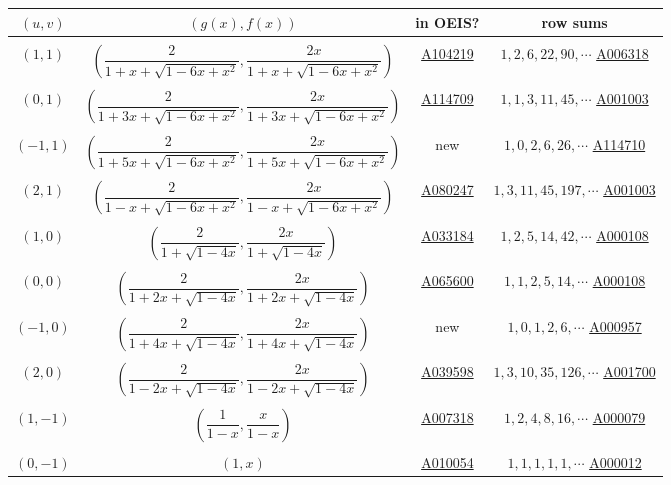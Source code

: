 \documentclass[11pt,reqno]{amsart}
\numberwithin{equation}{section}
\theoremstyle{plain}
\theoremstyle{definition}
\begin{document}
\begin{table}
{\small
\begin{tabular}{cccc}
\toprule
$(u,v)$ & $(g(x),f(x))$ & in OEIS? & row sums\\
\midrule
&&&\\
$(1,1)$ & $(\dfrac{2}{1+x+\sqrt{1-6x+x^2}},\dfrac{2x}{1+x+\sqrt{1-6x+x^2}})$ & \href{http://oeis.org/A104219}{A104219} & $1,2,6,22,90,\cdots$ \href{http://oeis.org/A006318}{A006318}\\
&&&\\
$(0,1)$ & $(\dfrac{2}{1+3x+\sqrt{1-6x+x^2}},\dfrac{2x}{1+3x+\sqrt{1-6x+x^2}})$ & \href{http://oeis.org/A114709}{A114709} & $1,1,3,11,45,\cdots$ \href{http://oeis.org/A001003}{A001003}\\
&&&\\
$(-1,1)$ & $(\dfrac{2}{1+5x+\sqrt{1-6x+x^2}},\dfrac{2x}{1+5x+\sqrt{1-6x+x^2}})$ & new & $1,0,2,6,26,\cdots$ \href{http://oeis.org/A114710}{A114710}\\
&&&\\
$(2,1)$ & $(\dfrac{2}{1-x+\sqrt{1-6x+x^2}},\dfrac{2x}{1-x+\sqrt{1-6x+x^2}})$ & \href{http://oeis.org/A080247}{A080247} & $1,3,11,45,197,\cdots$ \href{http://oeis.org/A001003}{A001003}\\
&&&\\
$(1,0)$ & $(\dfrac{2}{1+\sqrt{1-4x}},\dfrac{2x}{1+\sqrt{1-4x}})$ & \href{http://oeis.org/A033184}{A033184} & $1,2,5,14,42,\cdots$ \href{http://oeis.org/A000108}{A000108}\\
&&&\\
$(0,0)$ & $(\dfrac{2}{1+2x+\sqrt{1-4x}},\dfrac{2x}{1+2x+\sqrt{1-4x}})$ & \href{http://oeis.org/A065600}{A065600} & $1,1,2,5,14,\cdots$ \href{http://oeis.org/A000108}{A000108}\\
&&&\\
$(-1,0)$ & $(\dfrac{2}{1+4x+\sqrt{1-4x}},\dfrac{2x}{1+4x+\sqrt{1-4x}})$ & new & $1,0,1,2,6,\cdots$ \href{http://oeis.org/A000957}{A000957}\\
&&&\\
$(2,0)$ & $(\dfrac{2}{1-2x+\sqrt{1-4x}},\dfrac{2x}{1-2x+\sqrt{1-4x}})$ & \href{http://oeis.org/A039598}{A039598} & $1,3,10,35,126,\cdots$ \href{http://oeis.org/A001700}{A001700}\\
&&&\\
$(1,-1)$ & $(\dfrac{1}{1-x},\dfrac{x}{1-x})$ & \href{http://oeis.org/A007318}{A007318} & $1,2,4,8,16,\cdots$ \href{http://oeis.org/A000079}{A000079}\\
&&&\\
$(0,-1)$ & $(1,x)$ & \href{http://oeis.org/A010054}{A010054} & $1,1,1,1,1,\cdots$ \href{http://oeis.org/A000012}{A000012}\\

\end{tabular}}
\end{table}
\end{document}
